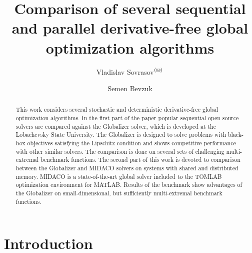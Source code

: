 \documentclass{svproc}
\def\letter{$^{\textrm{(\Letter)}}$}
\begin{document}
\mainmatter              %
%
\title{Comparison of several sequential and parallel derivative-free global optimization algorithms}
%
%
\author{Vladislav Sovrasov\letter \and Semen Bevzuk}
%
%
%

\maketitle              %

\begin{abstract}
This work considers several stochastic and deterministic derivative-free global optimization algorithms. In the first part of the paper popular sequential open-source solvers are compared against the Globalizer solver, which is developed at the Lobachevsky State University. The Globalizer is designed to solve problems with black-box objectives satisfying the Lipschitz condition and shows competitive performance with other similar solvers. The comparison is done on several sets of challenging multi-extremal benchmark functions. The second part of this work is devoted to comparison between the Globalizer and MIDACO solvers on systems with shared and distributed memory. MIDACO is a state-of-the-art global solver included to the TOMLAB optimization environment for MATLAB. Results of the benchmark show advantages of the Globalizer on small-dimensional, but sufficiently multi-extremal benchmark functions.
\end{abstract}
%
\section{Introduction}
\end{document}
